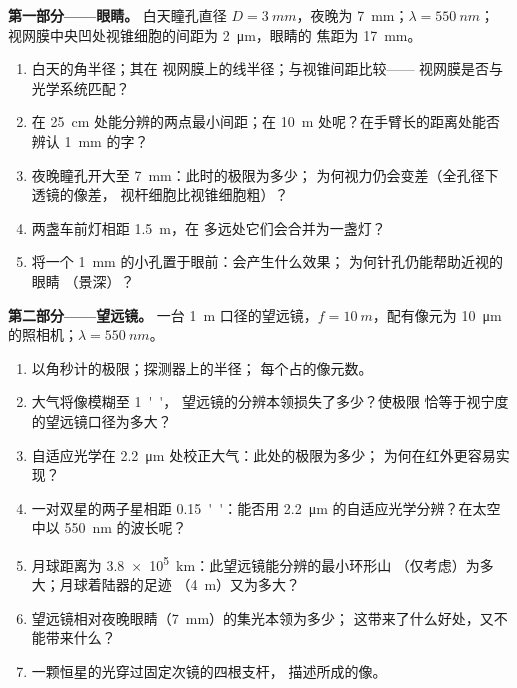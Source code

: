 \begin{problem}
\label{pb:b2:diffraction:1}

\medskip
\noindent\textbf{第一部分——眼睛。}
白天瞳孔直径 $D = \qty{3}{mm}$，夜晚为 \qty{7}{mm}；$\lambda = \qty{550}{nm}$；
视网膜中央凹处视锥细胞的间距为 \qty{2}{\micro m}，眼睛的
焦距为 \qty{17}{mm}。
\begin{enumerate}
  \item 白天的角半径；其在
        视网膜上的线半径；与视锥间距比较——
        视网膜是否与光学系统匹配？
  \item 在 \qty{25}{cm} 处能分辨的两点最小间距；在
        \qty{10}{m} 处呢？在手臂长的距离处能否辨认 \qty{1}{mm} 的字？
  \item 夜晚瞳孔开大至 \qty{7}{mm}：此时的极限为多少；
        为何视力仍会变差（全孔径下透镜的像差，
        视杆细胞比视锥细胞粗）？
  \item 两盏车前灯相距 \qty{1.5}{m}，在
        多远处它们会合并为一盏灯？
  \item 将一个 \qty{1}{mm} 的小孔置于眼前：会产生什么效果；
        为何针孔仍能帮助近视的眼睛
        （景深）？
\end{enumerate}

\medskip
\noindent\textbf{第二部分——望远镜。}
一台 \qty{1}{m} 口径的望远镜，$f = \qty{10}{m}$，配有像元为
\qty{10}{\micro m} 的照相机；$\lambda = \qty{550}{nm}$。
\begin{enumerate}[resume]
  \item 以角秒计的极限；探测器上的半径；
        每个占的像元数。
  \item 大气将像模糊至 \qty{1}{''}，
        望远镜的分辨本领损失了多少？使极限
        恰等于视宁度的望远镜口径为多大？
  \item 自适应光学在 \qty{2.2}{\micro m} 处校正大气：此处的极限为多少；
        为何在红外更容易实现？
  \item 一对双星的两子星相距 \qty{0.15}{''}：能否用 \qty{2.2}{\micro m}
        的自适应光学分辨？在太空中以 \qty{550}{nm} 的波长呢？
  \item 月球距离为 \qty{3.8e5}{km}：此望远镜能分辨的最小环形山
        （仅考虑）为多大；月球着陆器的足迹
        （\qty{4}{m}）又为多大？
  \item 望远镜相对夜晚眼睛（\qty{7}{mm}）的集光本领为多少；
        这带来了什么好处，又不能带来什么？
  \item 一颗恒星的光穿过固定次镜的四根支杆，
        描述所成的像。
\end{enumerate}


\end{problem}
